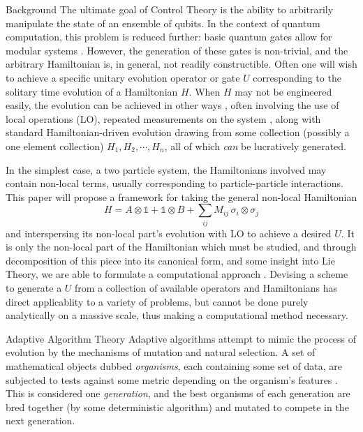 \documentclass[14pt]{beamer}
\begin{document}
	\begin{frame}
		\begin{columns}
			\begin{column}{.45\textwidth}
				\begin{exampleblock}{Background}
					The ultimate goal of Control Theory is the ability to arbitrarily manipulate the state of an ensemble of qubits. In the context of quantum computation, this problem is reduced further: basic quantum gates allow for modular systems \cite{bremner}. However, the generation of these gates is non-trivial, and the arbitrary Hamiltonian is, in general, not readily constructible. Often one will wish to achieve a specific unitary evolution operator or gate $U$ corresponding to the solitary time evolution of a Hamiltonian $H$. When $H$ may not be engineered easily, the evolution can be achieved in other ways \cite{bremner} , often involving the use of local operations (LO), repeated measurements on the system \cite{bennett}, along with standard Hamiltonian-driven evolution drawing from some collection (possibly a one element collection) $H_1, H_2, \cdots, H_n$, all of which \emph{can} be lucratively generated.

	In the simplest case, a two particle system, the Hamiltonians involved may contain non-local terms, usually corresponding to particle-particle interactions. This paper will propose a framework for taking the general non-local Hamiltonian \cite{bennett} 
	\begin{equation}
	H = A \otimes \mathds{1} + \mathds{1} \otimes B + \sum_{ij} M_{ij}\,  \sigma_i \otimes \sigma_j
	\end{equation}
	and interspersing its non-local part's evolution with LO to achieve a desired $U$. It is only the non-local part of the Hamiltonian which must be studied, and through decomposition of this piece into its canonical form, and some insight into Lie Theory, we are able to formulate a computational approach \cite{haselgrove}. Devising a scheme to generate a $U$ from a collection of available operators and Hamiltonians has direct applicablity to a variety of problems, but cannot be done purely analytically on a massive scale, thus making a computational method necessary.
				\end{exampleblock}
				\begin{block}{Adaptive Algorithm Theory}
	Adaptive algorithms attempt to mimic the process of evolution by the mechanisms of mutation and natural selection. A set of mathematical objects dubbed \emph{organisms}, each containing some set of data, are subjected to tests against some metric depending on the organism's features \cite{weise}. This is considered one \emph{generation}, and the best organisms of each generation are bred together (by some deterministic algorithm) and mutated to compete in the next generation.


\end{block}
\end{column}
\end{columns}
\end{frame}
\end{document}

